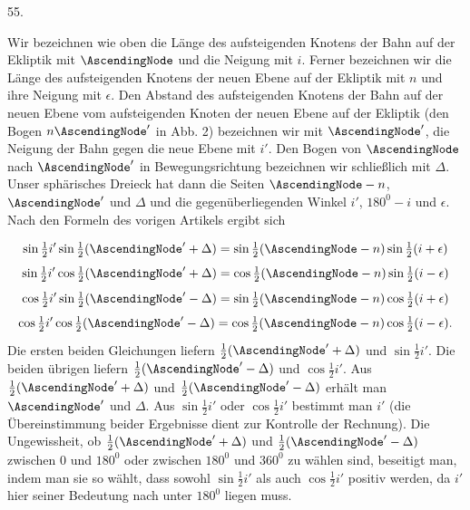 \par\medskip
\hypertarget{native-073-article055}{}
\begin{center}55.\end{center}
Wir bezeichnen wie oben die Länge des aufsteigenden Knotens der Bahn auf der Ekliptik mit $\AscendingNode$ und die Neigung mit $i$. Ferner bezeichnen wir die Länge des aufsteigenden Knotens der neuen Ebene auf der Ekliptik mit $n$ und ihre Neigung mit $\epsilon$. Den Abstand des aufsteigenden Knotens der Bahn auf der neuen Ebene vom aufsteigenden Knoten der neuen Ebene auf der Ekliptik (den Bogen $n\AscendingNode'$ in Abb. 2) bezeichnen wir mit $\AscendingNode'$, die Neigung der Bahn gegen die neue Ebene mit $i'$. Den Bogen von $\AscendingNode$ nach $\AscendingNode'$ in Bewegungsrichtung bezeichnen wir schließlich mit $\Delta$. Unser sphärisches Dreieck hat dann die Seiten $\AscendingNode-n$, $\AscendingNode'$ und $\Delta$ und die gegenüberliegenden Winkel $i'$, $180^0-i$ und $\epsilon$. Nach den Formeln des vorigen Artikels ergibt sich
\par{}
\[
\sin\tfrac{1}{2}i'\sin\tfrac{1}{2}(\AscendingNode'+\Delta) = \sin\tfrac{1}{2}(\AscendingNode-n)\sin\tfrac{1}{2}(i+\epsilon)
\]
\[
\sin\tfrac{1}{2}i'\cos\tfrac{1}{2}(\AscendingNode'+\Delta) = \cos\tfrac{1}{2}(\AscendingNode-n)\sin\tfrac{1}{2}(i-\epsilon)
\]
\[
\cos\tfrac{1}{2}i'\sin\tfrac{1}{2}(\AscendingNode'-\Delta) = \sin\tfrac{1}{2}(\AscendingNode-n)\cos\tfrac{1}{2}(i+\epsilon)
\]
\[
\cos\tfrac{1}{2}i'\cos\tfrac{1}{2}(\AscendingNode'-\Delta) = \cos\tfrac{1}{2}(\AscendingNode-n)\cos\tfrac{1}{2}(i-\epsilon).
\]
Die ersten beiden Gleichungen liefern $\frac{1}{2}(\AscendingNode'+\Delta)$ und
$\sin\frac{1}{2}i'$. Die beiden übrigen liefern $\frac{1}{2}(\AscendingNode'-\Delta)$ und $\cos\frac{1}{2}i'$.
Aus $\frac{1}{2}(\AscendingNode'+\Delta)$ und $\frac{1}{2}(\AscendingNode'-\Delta)$ erhält man $\AscendingNode'$ und
$\Delta$. Aus $\sin\frac{1}{2}i'$ oder $\cos\frac{1}{2}i'$ bestimmt man
$i'$ (die Übereinstimmung beider Ergebnisse dient zur Kontrolle der Rechnung). Die Ungewissheit, ob $\frac{1}{2}(\AscendingNode'+\Delta)$ und
$\frac{1}{2}(\AscendingNode'-\Delta)$ zwischen $0$ und $180^0$ oder zwischen $180^0$ und $360^0$ zu wählen sind,
beseitigt man, indem man sie so wählt, dass sowohl $\sin\frac{1}{2}i'$ als auch $\cos\frac{1}{2}i'$ positiv werden,
da $i'$ hier seiner Bedeutung nach unter $180^0$ liegen muss.
